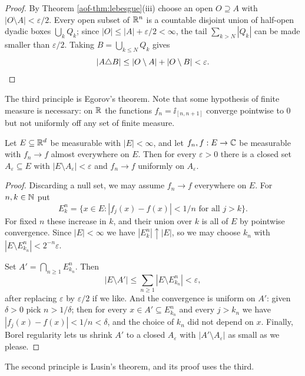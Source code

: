 \documentclass[a4paper]{scrartcl}
\begin{document}
\begin{proof}
	By Theorem \ref{aof-thm:lebesgue}(iii) choose an open $O \supseteq A$ with $|O \setminus A| < \varepsilon/2$. Every open subset of $\mathbb{R}^n$ is a countable disjoint union of half-open dyadic boxes $\bigcup_{k} Q_k$; since $|O| \le |A| + \varepsilon/2 < \infty$, the tail $\sum_{k > N} |Q_k|$ can be made smaller than $\varepsilon/2$. Taking $B = \bigcup_{k \le N} Q_k$ gives
	$$|A \triangle B| \le |O \setminus A| + |O \setminus B| < \varepsilon. \qedhere$$
\end{proof}

The third principle is Egorov's theorem. Note that some hypothesis of finite measure is necessary: on $\mathbb{R}$ the functions $f_n = \ii_{[n, n+1]}$ converge pointwise to $0$ but not uniformly off any set of finite measure.

\begin{theorem}[Egorov]\label{thm:egorov}
	Let $E \subseteq \mathbb{R}^d$ be measurable with $|E| < \infty$, and let $f_n, f : E \to \mathbb{C}$ be measurable with $f_n \to f$ almost everywhere on $E$. Then for every $\varepsilon > 0$ there is a closed set $A_\varepsilon \subseteq E$ with $|E \setminus A_\varepsilon| < \varepsilon$ and $f_n \to f$ uniformly on $A_\varepsilon$.
\end{theorem}

\begin{proof}
	Discarding a null set, we may assume $f_n \to f$ everywhere on $E$. For $n, k \in \mathbb{N}$ put
	$$E^n_k = \{ x \in E : |f_j(x) - f(x)| < 1/n \text{ for all } j > k\}.$$
	For fixed $n$ these increase in $k$, and their union over $k$ is all of $E$ by pointwise convergence. Since $|E| < \infty$ we have $|E^n_k| \uparrow |E|$, so we may choose $k_n$ with $|E \setminus E^n_{k_n}| < 2^{-n} \varepsilon$.

	Set $A' = \bigcap_{n \ge 1} E^n_{k_n}$. Then
	$$|E \setminus A'| \le \sum_{n \ge 1} |E \setminus E^n_{k_n}| < \varepsilon,$$
	after replacing $\varepsilon$ by $\varepsilon/2$ if we like. And the convergence is uniform on $A'$: given $\delta > 0$ pick $n > 1/\delta$; then for every $x \in A' \subseteq E^n_{k_n}$ and every $j > k_n$ we have $|f_j(x) - f(x)| < 1/n < \delta$, and the choice of $k_n$ did not depend on $x$. Finally, Borel regularity lets us shrink $A'$ to a closed $A_\varepsilon$ with $|A' \setminus A_\varepsilon|$ as small as we please.
\end{proof}

The second principle is Lusin's theorem, and its proof uses the third.
\end{document}
